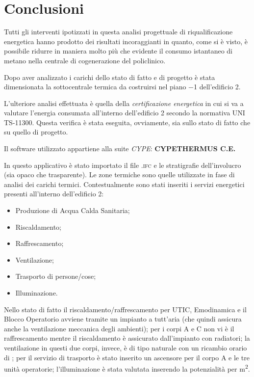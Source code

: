 \chapter{Conclusioni}
\thispagestyle{empty}
Tutti gli interventi ipotizzati in questa analisi progettuale di riqualificazione energetica hanno prodotto dei risultati incoraggianti in quanto, come si è visto, è possibile ridurre in maniera molto più che evidente il consumo istantaneo di metano nella centrale di cogenerazione del policlinico.

Dopo aver analizzato i carichi dello stato di fatto e di progetto è stata dimensionata la sottocentrale termica da costruirsi nel piano \num{-1} dell'edificio 2. 

L'ulteriore analisi effettuata è quella della \emph{certificazione energetica} in cui si va a valutare l'energia consumata all'interno dell'edificio 2 secondo la normativa UNI TS-11300. Questa verifica è stata eseguita, ovviamente, sia sullo stato di fatto che su quello di progetto.

Il software utilizzato appartiene alla suite \emph{CYPE}: \textbf{CYPETHERMUS C.E.}

In questo applicativo è stato importato il file \textsc{.ifc} e le stratigrafie dell'involucro (sia opaco che trasparente). Le zone termiche sono quelle utilizzate in fase di analisi dei carichi termici. Contestualmente sono stati inseriti i servizi energetici presenti all'interno dell'edificio 2:
\begin{itemize}
	\item Produzione di Acqua Calda Sanitaria;
	\item Riscaldamento;
	\item Raffrescamento;
	\item Ventilazione;
	\item Trasporto di persone/cose;
	\item Illuminazione.
\end{itemize}
Nello stato di fatto il riscaldamento/raffrescamento per UTIC, Emodinamica e il Blocco Operatorio avviene tramite un impianto a tutt'aria (che quindi assicura anche la ventilazione meccanica degli ambienti); per i corpi A e C non vi è il raffrescamento mentre il riscaldamento è assicurato dall'impianto con radiatori; la ventilazione in questi due corpi, invece, è di tipo naturale con un ricambio orario di ; per il servizio di trasporto è stato inserito un ascensore per il corpo A e le tre unità operatorie; l'illuminazione è stata valutata inserendo la potenzialità per \si{m^2}.

